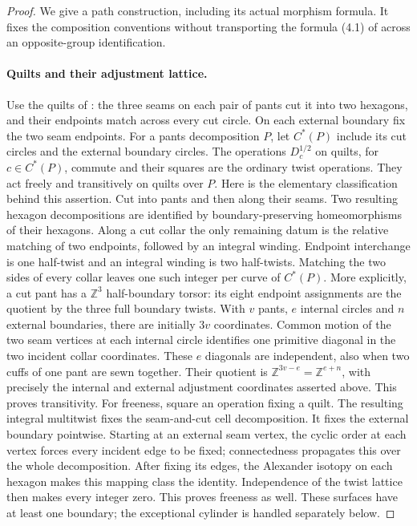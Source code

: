 \begin{proof}
We give a path construction, including its actual
morphism formula.  It fixes the composition
conventions without transporting the formula
(4.1) of \cite{ET_BonattoRobertson2026} across an
opposite-group identification.

\paragraph{Quilts and their adjustment lattice.}
Use the quilts of \cite[\S7]{ET_NS2000}: the three
seams on each pair of pants cut it into two
hexagons, and their endpoints match across every
cut circle.  On each external boundary fix the
two seam endpoints.  For a pants decomposition
$P$, let $C^*(P)$ include its cut circles and the
external boundary circles.
The operations $D_c^{1/2}$ on quilts, for
$c\in C^*(P)$, commute and their squares are the
ordinary twist operations.  They act freely and
transitively on quilts over $P$.
Here is the elementary classification behind this
assertion.  Cut into pants and then along their
seams.  Two resulting hexagon decompositions are
identified by boundary-preserving homeomorphisms
of their hexagons.  Along a cut collar the only
remaining datum is the relative matching of two
endpoints, followed by an integral winding.
Endpoint interchange is one half-twist and an
integral winding is two half-twists.  Matching
the two sides of every collar leaves one such
integer per curve of $C^*(P)$.
More explicitly, a cut pant has a
$\mathbb Z^3$ half-boundary torsor: its eight
endpoint assignments are the quotient by
the three full boundary twists.  With $v$
pants, $e$ internal circles and $n$ external
boundaries, there are initially $3v$
coordinates.  Common motion of the two seam
vertices at each internal circle identifies
one primitive diagonal in the two incident
collar coordinates.  These $e$ diagonals
are independent, also when two cuffs of
one pant are sewn together.  Their quotient
is $\mathbb Z^{3v-e}=\mathbb Z^{e+n}$,
with precisely the internal and external
adjustment coordinates asserted above.
This proves transitivity.  For freeness, square an operation
fixing a quilt.  The resulting integral
multitwist fixes the seam-and-cut cell
decomposition.  It fixes the external boundary
pointwise.  Starting at an external seam vertex,
the cyclic order at each vertex forces every
incident edge to be fixed; connectedness
propagates this over the whole decomposition.
After fixing its edges, the Alexander isotopy
on each hexagon makes this mapping class the
identity.  Independence of the twist lattice
then makes every integer zero.  This proves
freeness as well.  These surfaces have at least
one boundary; the exceptional cylinder is
handled separately below.


\end{proof}
